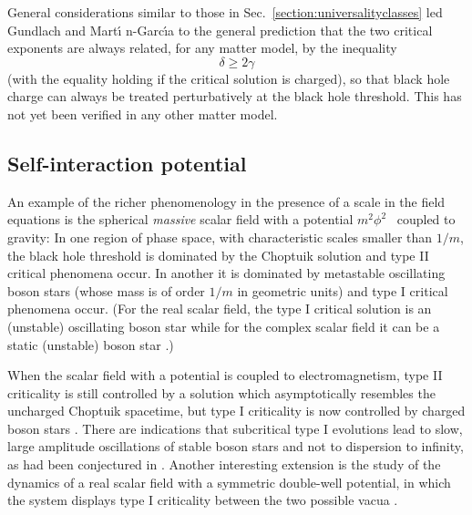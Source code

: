 \documentclass{article}
\begin{document}
General considerations similar to those in
Sec.~\ref{section:universalityclasses} led Gundlach and Mart\'\i
n-Garc\'\i a to the general prediction that the two critical exponents
are always related, for any matter model, by the inequality
\begin{equation}
\delta\ge2\gamma
\end{equation}
(with the equality holding if the critical solution is charged),
so that black hole charge can always be treated perturbatively at the
black hole threshold. This has not yet been verified in any other
matter model.


\subsection{Self-interaction potential}
\label{section:self-interaction}

An example of the richer phenomenology in the presence of a scale in
the field equations is the spherical {\em massive} scalar field with a
potential $m^2\phi^2$~\cite{BradyChambersGoncalves} coupled to
gravity: In one region of phase space, with characteristic scales
smaller than $1/m$, the black hole threshold is dominated by the
Choptuik solution and type II critical phenomena occur. In another it
is dominated by metastable oscillating boson stars (whose mass is of
order $1/m$ in geometric units) and type I critical phenomena
occur. (For the real scalar field, the type I critical solution
is an (unstable) oscillating boson star \cite{SeidelSuen} while for
the complex scalar field it can be a static (unstable) boson star
\cite{HawleyChoptuik}.)

When the scalar field with a potential is coupled 
to electromagnetism, type II criticality is still
controlled by a solution which asymptotically resembles the uncharged
Choptuik spacetime, but type I criticality is now controlled by
charged boson stars \cite{Petryk}. There are indications that
subcritical type I evolutions lead to slow, large amplitude
oscillations of stable boson stars \cite{Lai, LaiChoptuik, Petryk}
and not to dispersion to infinity, as had been conjectured in
\cite{HawleyChoptuik}. 
Another interesting extension is the study of the dynamics of a real
scalar field with a symmetric double-well potential, in which the
system displays type I criticality between the two possible vacua
\cite{HondaChoptuik}. 

\end{document}
